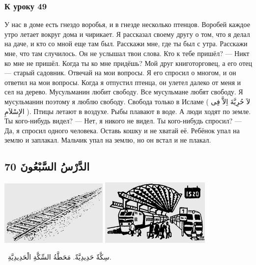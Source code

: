 \documentclass[a5paper]{article}
\begin{document}
\subsubsection{К уроку 49}
У нас в доме есть гнездо воробья, и в гнезде несколько птенцов. Воробей каждое утро летает вокруг дома и чирикает. Я рассказал своему другу о том, что я делал на даче, и кто со мной еще там был. Расскажи мне, где ты был с утра. Расскажи мне, что там случилось. Он не услышал твои слова. Кто к тебе пришёл? — Никт ко мне не пришёл. Когда ты ко мне придёшь? Мой друг книготорговец, а его отец — старый садовник. Отвечай на мои вопросы. Я его спросил о многом, и он ответил на мои вопросы. Когда я отпустил птенца, он улетел далеко от меня и сел на дерево. Мусульманин любит свободу. Все мусульмане любят свободу. Я мусульманин поэтому я люблю свободу. Свобода только в Исламе ( لاَ حُرِيَّةَ اِلاَّ فِى الإِسْلاَمِ ). Птицы летают в воздухе. Рыбы плавают в воде. А люди ходят по земле. Ты кого-нибудь видел? — Нет, я никого не видел. Ты кого-нибудь спросил? — Да, я спросил одного человека. Оставь кошку и не хватай её. Ребёнок упал на землю и заплакал. Мальчик упал на землю, но он встал и не плакал.

\subsection[الدَّرْسُ السَّبْعُونَ 70]{الدَّرْسُ السَّبْعُونَ 70}
 \includegraphics[width=2.0835in,height=1.2602in]{MuhammadBagauddinlatinized-img219.png}   \includegraphics[width=2.1146in,height=1.2811in]{MuhammadBagauddinlatinized-img220.png}  

\ سِكَّةٌ حَدِيدِيَّةٌ. مَحَطَّةُ السِّكَّةِ الْحَدِيدِيَّةِ. 
\end{document}
